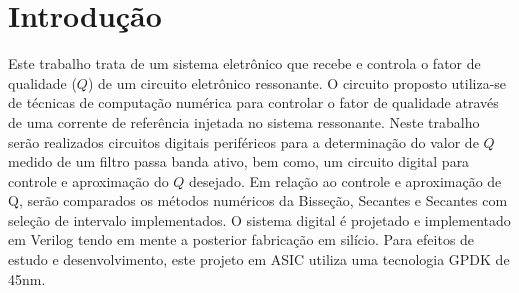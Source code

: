 


\textual

\chapter{Introdução}

% 

Este trabalho trata de um sistema eletrônico que recebe e controla o fator de qualidade ($Q$) de um circuito eletrônico ressonante. O circuito proposto utiliza-se de técnicas de computação numérica para controlar o fator de qualidade através de uma corrente de referência injetada no sistema ressonante. Neste trabalho serão realizados circuitos digitais periféricos para a determinação do valor de $Q$ medido de um filtro passa banda ativo, bem como, um circuito digital para controle e aproximação do $Q$ desejado. Em relação ao controle e aproximação de Q, serão comparados os métodos numéricos da Bisseção, Secantes e Secantes com seleção de intervalo implementados. O sistema digital é projetado e implementado em Verilog tendo em mente a posterior fabricação em silício. Para efeitos de estudo e desenvolvimento, este projeto em ASIC utiliza uma tecnologia GPDK de 45nm.
\postextual




